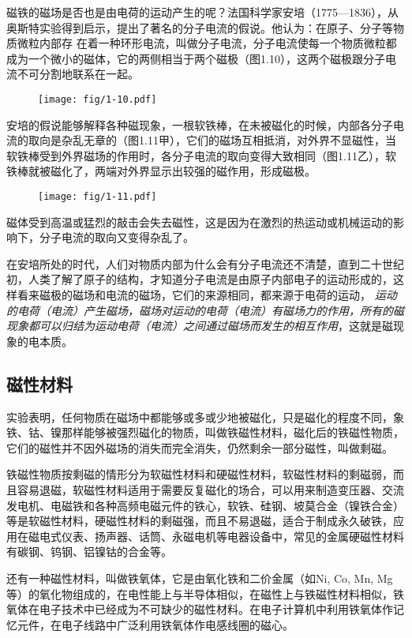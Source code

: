 磁铁的磁场是否也是由电荷的运动产生的呢？法国科学家安培（1775—1836），从奥斯特实验得到启示，提出了著名的分子电流的假说。他认为：在原子、分子等物质微粒内部存
在着一种环形电流，叫做分子电流，分子电流使每一个物质微粒都成为一个微小的磁体，它的两侧相当于两个磁极（图1.10），这两个磁极跟分子电流不可分割地联系在一起。

\begin{figure}[htp]\centering
\texttt{[image: fig/1-10.pdf]}
\caption{}
\end{figure}

安培的假说能够解释各种磁现象，一根软铁棒，在未被磁化的时候，内部各分子电流的取向是杂乱无章的（图1.11甲），它们的磁场互相抵消，对外界不显磁性，当软铁棒受到外界磁场的作用时，各分子电流的取向变得大致相同（图1.11乙），软铁棒就被磁化了，两端对外界显示出较强的磁作用，形成磁极。

\begin{figure}[htp]\centering
\texttt{[image: fig/1-11.pdf]}
\caption{}
\end{figure}

磁体受到高温或猛烈的敲击会失去磁性，这是因为在激烈的热运动或机械运动的影响下，分子电流的取向又变得杂乱了。

在安培所处的时代，人们对物质内部为什么会有分子电流还不清楚，直到二十世纪初，人类了解了原子的结构，才知道分子电流是由原子内部电子的运动形成的，这样看来磁极的磁场和电流的磁场，它们的来源相同，都来源于电荷的运动，
\textit{运动的电荷（电流）产生磁场，磁场对运动的电荷（电流）有磁场力的作用，所有的磁现象都可以归结为运动电荷（电流）之间通过磁场而发生的相互作用}，这就是磁现象的电本质。

\subsection{磁性材料}

实验表明，任何物质在磁场中都能够或多或少地被磁化，只是磁化的程度不同，象铁、钴、镍那样能够被强烈磁化的物质，叫做铁磁性材料，磁化后的铁磁性物质，它们的磁性并不因外磁场的消失而完全消失，仍然剩余一部分磁性，叫做剩磁。

铁磁性物质按剩磁的情形分为软磁性材料和硬磁性材料，软磁性材料的剩磁弱，而且容易退磁，软磁性材料适用于需要反复磁化的场合，可以用来制造变压器、交流发电机、电磁铁和各种高频电磁元件的铁心，软铁、硅钢、坡莫合金（镍铁合金）等是软磁性材料，硬磁性材料的剩磁强，而且不易退磁，适合于制成永久破铁，应用在磁电式仪表、扬声器、话筒、永磁电机等电器设备中，常见的金属硬磁性材料有碳钢、钨钢、铝镍钴的合金等。

还有一种磁性材料，叫做铁氧体，它是由氧化铁和二价金属（如Ni, Co, Mn, Mg等）的氧化物组成的，在电性能上与半导体相似，在磁性上与铁磁性材料相似，铁氧体在电子技术中已经成为不可缺少的磁性材料。在电子计算机中利用铁氧体作记忆元件，在电子线路中广泛利用铁氧体作电感线圈的磁心。

